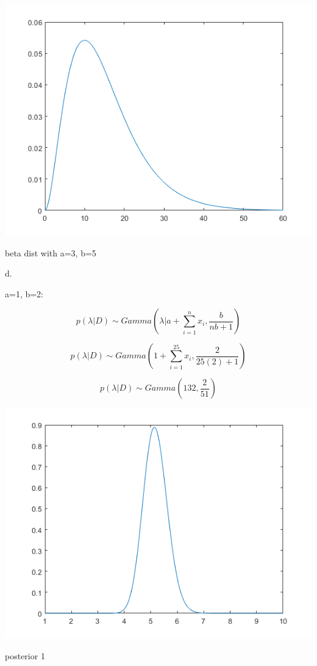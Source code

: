 \documentclass[a4paper]{article}
\begin{document}
\begin{center}
    \includegraphics[scale=1]{2c-2.png}
    \caption{beta dist with a=3, b=5}
\end{center}

d.

a=1, b=2:

$$p(\lambda|D)\sim Gamma(\lambda |a+\sum_{i=1}^{n}x_i, \frac{b}{nb+1})$$

$$p(\lambda|D)\sim Gamma(1+\sum_{i=1}^{25}x_i, \frac{2}{25(2)+1})$$

$$p(\lambda|D)\sim Gamma(132, \frac{2}{51})$$

\begin{center}
    \includegraphics[scale=1]{2d-1.png}
    \caption{posterior 1}
\end{center}
\end{document}
